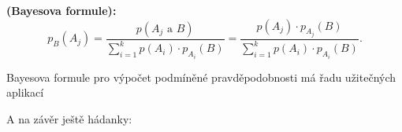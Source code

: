       \begin{mdframed}[style=mdmathdef]
        \begin{lemma}\label{mai:lemma005}
          \textbf{(Bayesova formule):}
          \begin{equation}\label{mai:eq058}
            p_B(A_j) = \dfrac{p(A_j\text{ a }B)}{\sum_{i=1}^{k}p(A_i)\cdot p_{A_i}(B)} 
                     = \dfrac{p(A_j)\cdot p_{A_j}(B)}{\sum_{i=1}^{k}p(A_i)\cdot p_{A_i}(B)} .
          \end{equation}
        \end{lemma}
      \end{mdframed}
      
      Bayesova formule pro výpočet podmíněné pravděpodobnosti má řadu užitečných aplikací
      
      
      
      A na závěr ještě hádanky:

      
      
      
